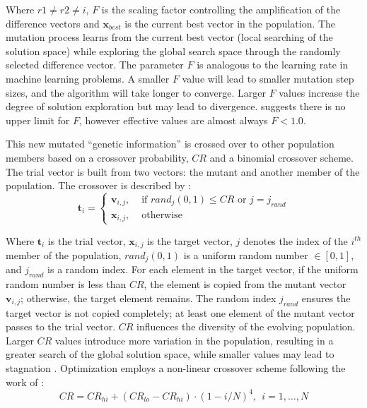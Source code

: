 Where $r1 \neq r2 \neq i$, $F$ is the scaling factor controlling the amplification of the difference vectors and $\mathbf{x}_{best}$ is the current best vector in the population. The mutation process learns from the current best vector (local searching of the solution space) while exploring the global search space through the randomly selected difference vector. The parameter $F$ is analogous to the learning rate in machine learning problems. A smaller $F$ value will lead to smaller mutation step sizes, and the algorithm will take longer to converge. Larger $F$ values increase the degree of solution exploration but may lead to divergence. \cite{price2013differential} suggests there is no upper limit for $F$, however effective values are almost always $F < 1.0$.

This new mutated ``genetic information'' is crossed over to other population members based on a crossover probability, $CR$ and a binomial crossover scheme. The trial vector is built from two vectors: the mutant and another member of the population. The crossover is described by \citep{price2013differential}:
\begin{equation}
    \mathbf{t}_{i} =
    \begin{cases}
        \mathbf{v}_{i, j}, & \text{ if }rand_{j}(0,1) \leq CR \text{ or } j=j_{rand} \\
        \mathbf{x}_{i, j}, & \text{ otherwise }
    \end{cases}
    \label{eq:crossover}
\end{equation}

Where $\mathbf{t}_{i}$ is the trial vector, $\mathbf{x}_{i, j}$ is the target vector, $j$ denotes the index of the $i^{th}$ member of the population, $rand_{j}(0,1)$ is a uniform random number $\in [0,1]$, and $j_{rand}$ is a random index. For each element in the target vector, if the uniform random number is less than $CR$, the element is copied from the mutant vector $\mathbf{v}_{i, j}$; otherwise, the target element remains. The random index $j_{rand}$ ensures the target vector is not copied completely; at least one element of the mutant vector passes to the trial vector. $CR$ influences the diversity of the evolving population. Larger $CR$ values introduce more variation in the population, resulting in a greater search of the global solution space, while smaller values may lead to stagnation \citep{georgioudakis2020comparative}. Optimization employs a non-linear crossover scheme following the work of \cite{mohamed2014rdel}:
\begin{equation}
    CR = CR_{hi} + (CR_{lo} - CR_{hi}) \cdot (1-i/N)^{4}, \ \ i=1,\dots, N
    \label{eq:f(cross)}
\end{equation}

